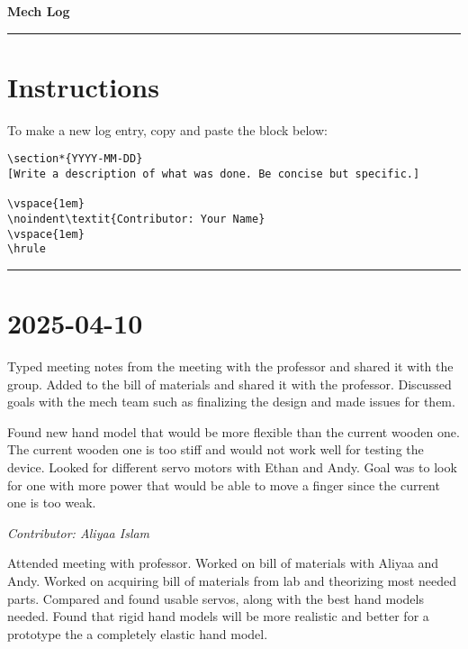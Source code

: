 \documentclass[12pt]{article}
\begin{document}
\begin{center}
    {\Huge\bfseries Mech Log}
\end{center}
\vspace{1em}
\hrule
\vspace{1em}

\section*{Instructions}
To make a new log entry, copy and paste the block below:

\begin{verbatim}
\section*{YYYY-MM-DD}
[Write a description of what was done. Be concise but specific.]

\vspace{1em}
\noindent\textit{Contributor: Your Name}
\vspace{1em}
\hrule
\end{verbatim}

\vspace{1em}
\hrule
\vspace{1em}


\section*{2025-04-10}
Typed meeting notes from the meeting with the professor and shared it with the group. Added to the bill of materials and shared it with the professor. Discussed goals with the mech team such as finalizing the design and made issues for them. 

Found new hand model that would be more flexible than the current wooden one. The current wooden one is too stiff and would not work well for testing the device. 
Looked for different servo motors with Ethan and Andy. Goal was to look for one with more power that would be able to move a finger since the current one is too weak. 

\vspace{1em}
\noindent\textit{Contributor: Aliyaa Islam}
\vspace{1em}

Attended meeting with professor. Worked on bill of materials with Aliyaa and Andy. Worked on acquiring bill of materials from lab and theorizing most needed parts. Compared and found usable servos, along with the best hand models needed. Found that rigid hand models will be more realistic and better for a prototype the a completely elastic hand model. 
\end{document}
